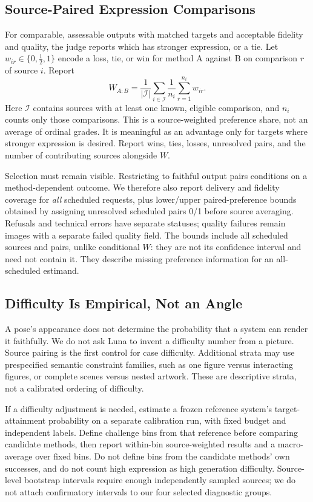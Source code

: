 \documentclass[11pt]{article}
\begin{document}
\subsection{Source-Paired Expression Comparisons}
For comparable, assessable outputs with matched targets and acceptable fidelity and quality, the judge reports which has stronger expression, or a tie. Let $w_{ir}\in\{0,\tfrac12,1\}$ encode a loss, tie, or win for method A against B on comparison $r$ of source $i$. Report
\begin{equation}
 W_{A:B}=\frac{1}{|\mathcal I|}\sum_{i\in\mathcal I}
             \frac{1}{n_i}\sum_{r=1}^{n_i} w_{ir}.
\end{equation}
Here $\mathcal I$ contains sources with at least one known, eligible comparison, and $n_i$ counts only those comparisons. This is a source-weighted preference share, not an average of ordinal grades. It is meaningful as an advantage only for targets where stronger expression is desired. Report wins, ties, losses, unresolved pairs, and the number of contributing sources alongside $W$.

Selection must remain visible. Restricting to faithful output pairs conditions on a method-dependent outcome. We therefore also report delivery and fidelity coverage for \emph{all} scheduled requests, plus lower/upper paired-preference bounds obtained by assigning unresolved scheduled pairs 0/1 before source averaging. Refusals and technical errors have separate statuses; quality failures remain images with a separate failed quality field. The bounds include all scheduled sources and pairs, unlike conditional $W$: they are not its confidence interval and need not contain it. They describe missing preference information for an all-scheduled estimand.

\subsection{Difficulty Is Empirical, Not an Angle}
A pose's appearance does not determine the probability that a system can render it faithfully. We do not ask Luna to invent a difficulty number from a picture. Source pairing is the first control for case difficulty. Additional strata may use prespecified semantic constraint families, such as one figure versus interacting figures, or complete scenes versus nested artwork. These are descriptive strata, not a calibrated ordering of difficulty.

If a difficulty adjustment is needed, estimate a frozen reference system's target-attainment probability on a separate calibration run, with fixed budget and independent labels. Define challenge bins from that reference before comparing candidate methods, then report within-bin source-weighted results and a macro-average over fixed bins. Do not define bins from the candidate methods' own successes, and do not count high expression as high generation difficulty. Source-level bootstrap intervals require enough independently sampled sources; we do not attach confirmatory intervals to our four selected diagnostic groups.
\end{document}

